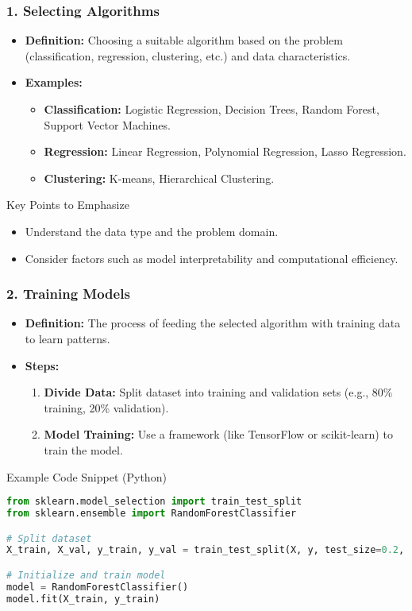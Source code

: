 \documentclass{beamer}
\begin{document}
\begin{frame}
    \frametitle{1. Selecting Algorithms}
    \begin{itemize}
        \item \textbf{Definition:} Choosing a suitable algorithm based on the problem (classification, regression, clustering, etc.) and data characteristics.
        \item \textbf{Examples:}
        \begin{itemize}
            \item \textbf{Classification:} Logistic Regression, Decision Trees, Random Forest, Support Vector Machines.
            \item \textbf{Regression:} Linear Regression, Polynomial Regression, Lasso Regression.
            \item \textbf{Clustering:} K-means, Hierarchical Clustering.
        \end{itemize}
    \end{itemize}
    
    \begin{block}{Key Points to Emphasize}
        \begin{itemize}
            \item Understand the data type and the problem domain.
            \item Consider factors such as model interpretability and computational efficiency.
        \end{itemize}
    \end{block}
\end{frame}

\begin{frame}[fragile]
    \frametitle{2. Training Models}
    \begin{itemize}
        \item \textbf{Definition:} The process of feeding the selected algorithm with training data to learn patterns.
        \item \textbf{Steps:}
        \begin{enumerate}
            \item \textbf{Divide Data:} Split dataset into training and validation sets (e.g., 80\% training, 20\% validation).
            \item \textbf{Model Training:} Use a framework (like TensorFlow or scikit-learn) to train the model.
        \end{enumerate}
    \end{itemize}
    
    \begin{block}{Example Code Snippet (Python)}
        \begin{lstlisting}[language=Python]
from sklearn.model_selection import train_test_split
from sklearn.ensemble import RandomForestClassifier

# Split dataset
X_train, X_val, y_train, y_val = train_test_split(X, y, test_size=0.2, random_state=42)

# Initialize and train model
model = RandomForestClassifier()
model.fit(X_train, y_train)
        \end{lstlisting}
    \end{block}
\end{frame}
\end{document}
